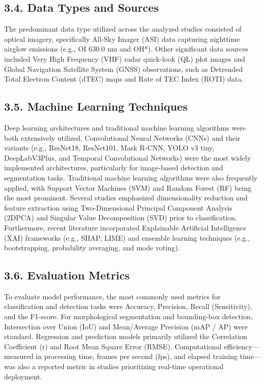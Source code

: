 \hypertarget{data-types-and-sources}{%
\subsection{3.4. Data Types and Sources}\label{data-types-and-sources}}

The predominant data type utilized across the analyzed studies consisted
of optical imagery, specifically All-Sky Imager (ASI) data capturing
nighttime airglow emissions (e.g., OI 630.0 nm and OH*). Other
significant data sources included Very High Frequency (VHF) radar
quick-look (QL) plot images and Global Navigation Satellite System
(GNSS) observations, such as Detrended Total Electron Content (dTEC)
maps and Rate of TEC Index (ROTI) data.

\hypertarget{machine-learning-techniques}{%
\subsection{3.5. Machine Learning
Techniques}\label{machine-learning-techniques}}

Deep learning architectures and traditional machine learning algorithms
were both extensively utilized. Convolutional Neural Networks (CNNs) and
their variants (e.g., ResNet18, ResNet101, Mask R-CNN, YOLO v3 tiny,
DeepLabV3Plus, and Temporal Convolutional Networks) were the most widely
implemented architectures, particularly for image-based detection and
segmentation tasks. Traditional machine learning algorithms were also
frequently applied, with Support Vector Machines (SVM) and Random Forest
(RF) being the most prominent. Several studies emphasized dimensionality
reduction and feature extraction using Two-Dimensional Principal
Component Analysis (2DPCA) and Singular Value Decomposition (SVD) prior
to classification. Furthermore, recent literature incorporated
Explainable Artificial Intelligence (XAI) frameworks (e.g., SHAP, LIME)
and ensemble learning techniques (e.g., bootstrapping, probability
averaging, and mode voting).

\hypertarget{evaluation-metrics}{%
\subsection{3.6. Evaluation Metrics}\label{evaluation-metrics}}

To evaluate model performance, the most commonly used metrics for
classification and detection tasks were Accuracy, Precision, Recall
(Sensitivity), and the F1-score. For morphological segmentation and
bounding-box detection, Intersection over Union (IoU) and Mean/Average
Precision (mAP / AP) were standard. Regression and prediction models
primarily utilized the Correlation Coefficient (r) and Root Mean Square
Error (RMSE). Computational efficiency---measured in processing time,
frames per second (fps), and elapsed training time---was also a reported
metric in studies prioritizing real-time operational deployment.

